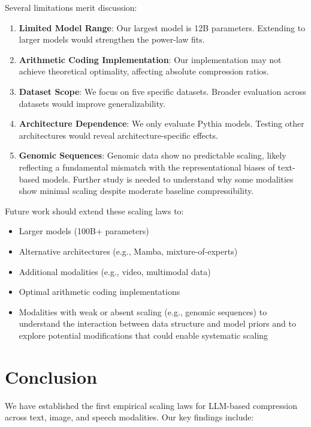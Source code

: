 \documentclass[10pt]{article} %
\begin{document}
Several limitations merit discussion:

\begin{enumerate}
\item \textbf{Limited Model Range}: Our largest model is 12B parameters. Extending to larger models would strengthen the power-law fits.
\item \textbf{Arithmetic Coding Implementation}: Our implementation may not achieve theoretical optimality, affecting absolute compression ratios.
\item \textbf{Dataset Scope}: We focus on five specific datasets. Broader evaluation across datasets would improve generalizability.
\item \textbf{Architecture Dependence}: We only evaluate Pythia models. Testing other architectures would reveal architecture-specific effects.
\item \textbf{Genomic Sequences}: Genomic data show no predictable scaling, likely reflecting a fundamental mismatch with the representational biases of text-based models. Further study is needed to understand why some modalities show minimal scaling despite moderate baseline compressibility.
\end{enumerate}

Future work should extend these scaling laws to:
\begin{itemize}
\item Larger models (100B+ parameters)
\item Alternative architectures (e.g., Mamba, mixture-of-experts)
\item Additional modalities (e.g., video, multimodal data)
\item Optimal arithmetic coding implementations
\item Modalities with weak or absent scaling (e.g., genomic sequences) to understand the interaction between data structure and model priors and to explore potential modifications that could enable systematic scaling
\end{itemize}

\section{Conclusion}

We have established the first empirical scaling laws for LLM-based compression across text, image, and speech modalities. Our key findings include:
\end{document}
